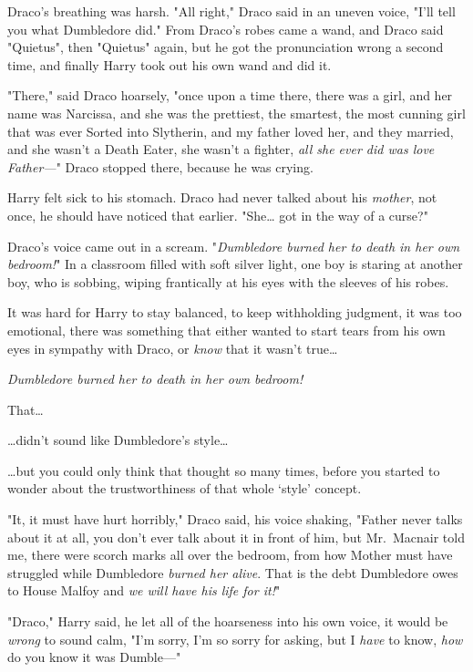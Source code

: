 Draco's breathing was harsh. "All right," Draco said in an uneven voice, "I'll 
tell you what Dumbledore did." From Draco's robes came a wand, and Draco said 
"Quietus", then "Quietus" again, but he got the pronunciation wrong a second 
time, and finally Harry took out his own wand and did it.

"There," said Draco hoarsely, "once upon a time there, there was a girl, and 
her name was Narcissa, and she was the prettiest, the smartest, the most 
cunning girl that was ever Sorted into Slytherin, and my father loved her, and 
they married, and she wasn't a Death Eater, she wasn't a fighter, \emph{all she 
ever did was love Father---}" Draco stopped there, because he was crying.

Harry felt sick to his stomach. Draco had never talked about his \emph{mother}, 
not once, he should have noticed that earlier. "She{\ldots} got in the way of a 
curse?"

Draco's voice came out in a scream. "\emph{Dumbledore burned her to death in 
her own bedroom!}"
\sbreak
In a classroom filled with soft silver light, one boy is staring at another 
boy, who is sobbing, wiping frantically at his eyes with the sleeves of his 
robes.

It was hard for Harry to stay balanced, to keep withholding judgment, it was 
too emotional, there was something that either wanted to start tears from his 
own eyes in sympathy with Draco, or \emph{know} that it wasn't true{\ldots}

\emph{Dumbledore burned her to death in her own bedroom!}

That{\ldots}

{\ldots}didn't sound like Dumbledore's style{\ldots}

{\ldots}but you could only think that thought so many times, before you started 
to wonder about the trustworthiness of that whole `style' concept.

"It, it must have hurt horribly," Draco said, his voice shaking, "Father never 
talks about it at all, you don't ever talk about it in front of him, but 
Mr.~Macnair told me, there were scorch marks all over the bedroom, from how 
Mother must have struggled while Dumbledore \emph{burned her alive}. That is 
the debt Dumbledore owes to House Malfoy and \emph{we will have his life for 
it!}"

"Draco," Harry said, he let all of the hoarseness into his own voice, it would 
be \emph{wrong} to sound calm, "I'm sorry, I'm so sorry for asking, but I 
\emph{have} to know, \emph{how} do you know it was Dumble---"

